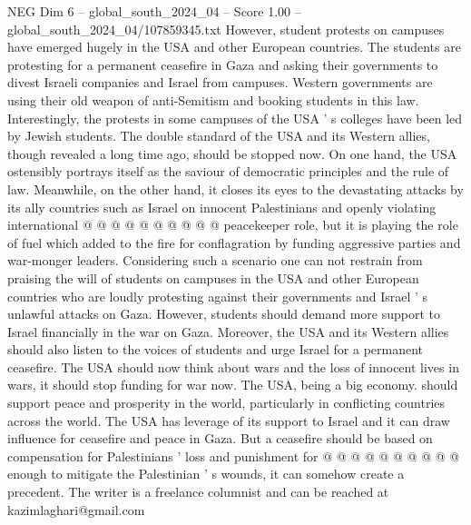 \begin{textsample}{NEG Dim 6 – global\_south\_2024\_04 – Score 1.00 – global\_south\_2024\_04/107859345.txt}
However, student protests on campuses have emerged hugely in the USA and other European countries.
The students are protesting for a permanent ceasefire in Gaza and asking their governments to divest Israeli companies and Israel from campuses.
Western governments are using their old weapon of anti-Semitism and booking students in this law.
Interestingly, the protests in some campuses of the USA ' s colleges have been led by Jewish students.
The double standard of the USA and its Western allies, though revealed a long time ago, should be stopped now.
On one hand, the USA ostensibly portrays itself as the saviour of democratic principles and the rule of law.
Meanwhile, on the other hand, it closes its eyes to the devastating attacks by its ally countries such as Israel on innocent Palestinians and openly violating international @ @ @ @ @ @ @ @ @ @ peacekeeper role, but it is playing the role of fuel which added to the fire for conflagration by funding aggressive parties and war-monger leaders.
Considering such a scenario one can not restrain from praising the will of students on campuses in the USA and other European countries who are loudly protesting against their governments and Israel ' s unlawful attacks on Gaza.
However, students should demand more support to Israel financially in the war on Gaza.
Moreover, the USA and its Western allies should also listen to the voices of students and urge Israel for a permanent ceasefire.
The USA should now think about wars and the loss of innocent lives in wars, it should stop funding for war now.
The USA, being a big economy. should support peace and prosperity in the world, particularly in conflicting countries across the world.
The USA has leverage of its support to Israel and it can draw influence for ceasefire and peace in Gaza.
But a ceasefire should be based on compensation for Palestinians ' loss and punishment for @ @ @ @ @ @ @ @ @ @ enough to mitigate the Palestinian ' s wounds, it can somehow create a precedent.
The writer is a freelance columnist and can be reached at kazimlaghari@gmail.com

\end{textsample}
